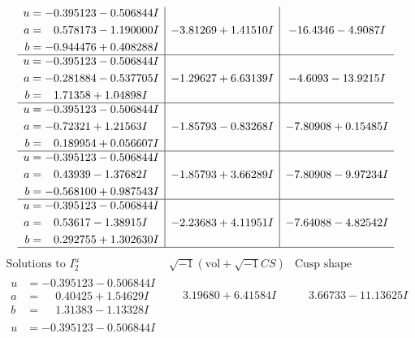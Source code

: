 \documentclass[1p]{elsarticle_modified}
\theoremstyle{definition}
\newcommand{\I}{\sqrt{-1}}
\begin{document}
$$\begin{array}{c|c|c}
\begin{aligned}
u &= -0.395123 - 0.506844 I \\
a &= \phantom{-}0.578173 - 1.190000 I \\
b &= -0.944476 + 0.408288 I\end{aligned}
 & -3.81269 + 1.41510 I & -16.4346 - 4.9087 I \\ \hline\begin{aligned}
u &= -0.395123 - 0.506844 I \\
a &= -0.281884 - 0.537705 I \\
b &= \phantom{-}1.71358 + 1.04898 I\end{aligned}
 & -1.29627 + 6.63139 I & -4.6093 - 13.9215 I \\ \hline\begin{aligned}
u &= -0.395123 - 0.506844 I \\
a &= -0.72321 + 1.21563 I \\
b &= \phantom{-}0.189954 + 0.056607 I\end{aligned}
 & -1.85793 - 0.83268 I & -7.80908 + 0.15485 I \\ \hline\begin{aligned}
u &= -0.395123 - 0.506844 I \\
a &= \phantom{-}0.43939 - 1.37682 I \\
b &= -0.568100 + 0.987543 I\end{aligned}
 & -1.85793 + 3.66289 I & -7.80908 - 9.97234 I \\ \hline\begin{aligned}
u &= -0.395123 - 0.506844 I \\
a &= \phantom{-}0.53617 - 1.38915 I \\
b &= \phantom{-}0.292755 + 1.302630 I\end{aligned}
 & -2.23683 + 4.11951 I & -7.64088 - 4.82542 I\\
 \hline 
 \end{array}$$\newpage$$\begin{array}{c|c|c}  
\text{Solutions to }I^u_{2}& \I (\text{vol} + \sqrt{-1}CS) & \text{Cusp shape}\\
 \hline 
\begin{aligned}
u &= -0.395123 - 0.506844 I \\
a &= \phantom{-}0.40425 + 1.54629 I \\
b &= \phantom{-}1.31383 - 1.13328 I\end{aligned}
 & \phantom{-}3.19680 + 6.41584 I & \phantom{-}3.66733 - 11.13625 I \\ \hline\begin{aligned}
u &= -0.395123 - 0.506844 I \\

\end{aligned}
\end{array}$$
\end{document}
